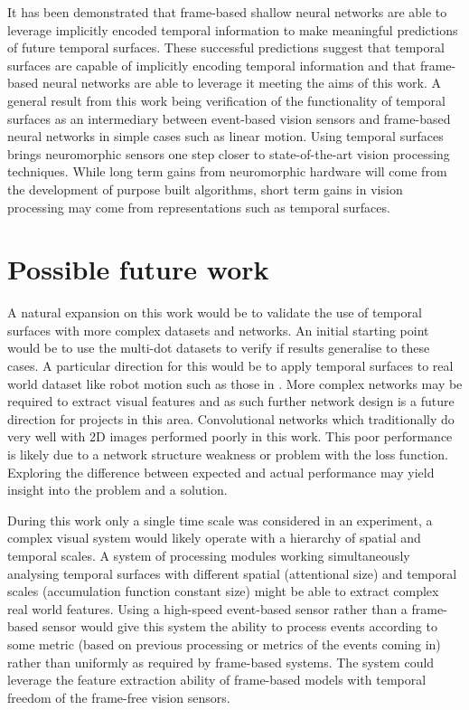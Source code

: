 It has been demonstrated that frame-based shallow neural networks are able to leverage implicitly encoded temporal information to make meaningful predictions of future temporal surfaces. 
These successful predictions suggest that temporal surfaces are capable of implicitly encoding temporal information and that frame-based neural networks are able to leverage it meeting the aims of this work. 
A general result from this work being verification of the functionality of temporal surfaces as an intermediary between event-based vision sensors and frame-based neural networks in simple cases such as linear motion. 
Using temporal surfaces brings neuromorphic sensors one step closer to state-of-the-art vision processing techniques. 
While long term gains from neuromorphic hardware will come from the development of purpose built algorithms, short term gains in vision processing may come from representations such as temporal surfaces.  


\section{Possible future work}
A natural expansion on this work would be to validate the use of temporal surfaces with more complex datasets and networks. 
An initial starting point would be to use the multi-dot datasets to verify if results generalise to these cases.
A particular direction for this would be to apply temporal surfaces to real world dataset like robot motion such as those in \cite{Gibson2014, barranco2016dataset}. 
More complex networks may be required to extract visual features and as such further network design is a future direction for projects in this area. 
Convolutional networks which traditionally do very well with 2D images performed poorly in this work.
This poor performance is likely due to a network structure weakness or problem with the loss function. 
Exploring the difference between expected and actual performance may yield insight into the problem and a solution. 

During this work only a single time scale was considered in an experiment, a complex visual system would likely operate with a hierarchy of spatial and temporal scales.
A system of processing modules working simultaneously analysing temporal surfaces with different spatial (attentional size) and temporal scales (accumulation function constant size) might be able to extract complex real world features. 
Using a high-speed event-based sensor rather than a frame-based sensor would give this system the ability to process events according to some metric (based on previous processing or metrics of the events coming in) rather than uniformly as required by frame-based systems. 
The system could leverage the feature extraction ability of frame-based models with temporal freedom of the frame-free vision sensors.









